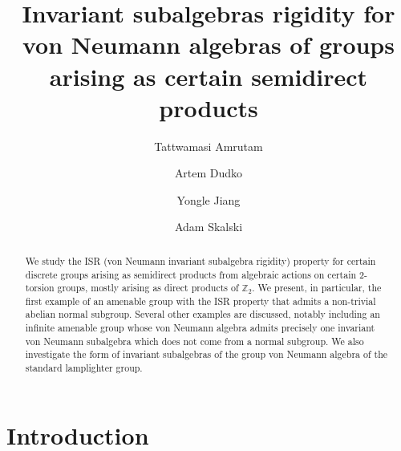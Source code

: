 \documentclass[11pt]{amsart}
\newcommand{\Z}{\mathbb Z}
\theoremstyle{plain}
\theoremstyle{definition}
\theoremstyle{remark}
\numberwithin{equation}{section}
\begin{document}

\title[ISR for semidirect products]{Invariant subalgebras rigidity for von Neumann algebras of groups arising as certain semidirect products}



\author{Tattwamasi Amrutam}
\address{Institute of Mathematics of the Polish Academy of Sciences, ul.~\'Sniadeckich 8, 00--656 Warszawa, Poland}

\author{Artem Dudko}
\address{Institute of Mathematics of the Polish Academy of Sciences, ul.~\'Sniadeckich 8, 00--656 Warszawa, Poland}

\author{Yongle Jiang}
\address{School of Mathematical Sciences, Dalian University of Technology, Dalian, 116024, China}

\author{Adam Skalski}
\address{Institute of Mathematics of the Polish Academy of Sciences, ul.~\'Sniadeckich 8, 00--656 Warszawa, Poland}






\begin{abstract}
We study the ISR (von Neumann invariant subalgebra rigidity) property for certain discrete groups arising as semidirect products from algebraic actions on certain 2-torsion groups, mostly arising as direct products of $\Z_2$.  We present, in particular, the first example of an amenable group with the ISR property that admits a non-trivial abelian normal subgroup. Several other examples are discussed, notably including an infinite amenable group whose von Neumann algebra admits precisely one invariant von Neumann subalgebra which does not come from a normal subgroup. We also investigate the form of invariant subalgebras of the group von Neumann algebra of the standard lamplighter group.
\end{abstract}




\maketitle


\section{Introduction}
\end{document}
